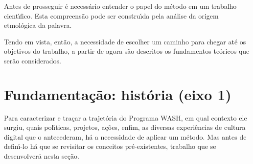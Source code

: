 \documentclass[
12pt,		%
openright,	%
twoside,  %
a4paper,			%
chapter=TITLE,		%
english,			%
french,				%
spanish,			%
brazil				%
]{USPSC-classe/USPSC}
\begin{document}
Antes de prosseguir \'e necess\'ario entender o papel do m\'etodo em um trabalho cient\'{\i}fico. Esta compreens\~ao pode ser constru\'{\i}da pela an\'alise da origem etmol\'ogica da palavra.















\noindent\begin{center}\mbox{\centering{}}\end{center}


Tendo em vista, ent\~ao, a necessidade de escolher um caminho para chegar at\'e os objetivos do trabalho, a partir de agora s\~ao descritos os fundamentos te\'oricos que ser\~ao considerados.














\section[Fundamenta\c{c}\~ao: hist\'oria (eixo 1)]{Fundamenta\c{c}\~ao: hist\'oria (eixo 1)}\label{Fundamenta\c{c}\~ao: hist\'oria (eixo 1)}
Para caracterizar e tra\c{c}ar a trajet\'oria do Programa WASH, em qual contexto ele surgiu, quais pol\'{\i}ticas, projetos, a\c{c}\~oes, enfim, as diversas experi\^encias de cultura digital que o antecederam, h\'a a necessidade de aplicar um m\'etodo. Mas antes de defin\'{\i}-lo h\'a que se revisitar os conceitos pr\'e-existentes, trabalho que se desenvolver\'a nesta se\c{c}\~ao.
\end{document}
